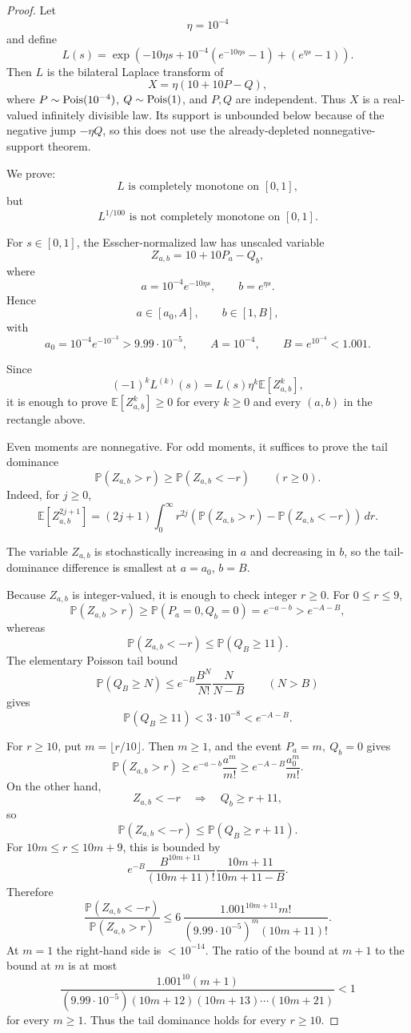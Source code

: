 \documentclass[11pt]{article}
\numberwithin{equation}{section}
\theoremstyle{definition}
\theoremstyle{remark}
\newcommand{\1}{\mathbf 1}
\begin{document}
\begin{proof}
Let
\[
\eta=10^{-4}
\]
and define
\[
L(s)=\exp\left(
-10\eta s+10^{-4}\left(e^{-10\eta s}-1\right)+\left(e^{\eta s}-1\right)
\right).
\]
Then \(L\) is the bilateral Laplace transform of
\[
X=\eta(10+10P-Q),
\]
where \(P\sim {\rm Pois}(10^{-4})\), \(Q\sim{\rm Pois}(1)\), and \(P,Q\) are independent. Thus \(X\) is a real-valued infinitely divisible law. Its support is unbounded below because of the negative jump \(-\eta Q\), so this does not use the already-depleted nonnegative-support theorem.

We prove:
\[
L\text{ is completely monotone on }[0,1],
\]
but
\[
L^{1/100}\text{ is not completely monotone on }[0,1].
\]

For \(s\in[0,1]\), the Esscher-normalized law has unscaled variable
\[
Z_{a,b}=10+10P_a-Q_b,
\]
where
\[
a=10^{-4}e^{-10\eta s},\qquad b=e^{\eta s}.
\]
Hence
\[
a\in[a_0,A],\qquad b\in[1,B],
\]
with
\[
a_0=10^{-4}e^{-10^{-3}}>9.99\cdot10^{-5},\qquad
A=10^{-4},\qquad B=e^{10^{-4}}<1.001.
\]

Since
\[
(-1)^kL^{(k)}(s)=L(s)\eta^k\mathbb E[Z_{a,b}^k],
\]
it is enough to prove \(\mathbb E[Z_{a,b}^k]\ge0\) for every \(k\ge0\) and every \((a,b)\) in the rectangle above.

Even moments are nonnegative. For odd moments, it suffices to prove the tail dominance
\[
\mathbb P(Z_{a,b}>r)\ge \mathbb P(Z_{a,b}<-r)
\qquad(r\ge0).
\]
Indeed, for \(j\ge0\),
\[
\mathbb E[Z_{a,b}^{2j+1}]
=(2j+1)\int_0^\infty r^{2j}
\left(\mathbb P(Z_{a,b}>r)-\mathbb P(Z_{a,b}<-r)\right)\,dr.
\]

The variable \(Z_{a,b}\) is stochastically increasing in \(a\) and decreasing in \(b\), so the tail-dominance difference is smallest at \(a=a_0\), \(b=B\).

Because \(Z_{a,b}\) is integer-valued, it is enough to check integer \(r\ge0\). For \(0\le r\le9\),
\[
\mathbb P(Z_{a,b}>r)\ge \mathbb P(P_a=0,Q_b=0)=e^{-a-b}>e^{-A-B},
\]
whereas
\[
\mathbb P(Z_{a,b}<-r)\le\mathbb P(Q_B\ge11).
\]
The elementary Poisson tail bound
\[
\mathbb P(Q_B\ge N)
\le e^{-B}\frac{B^N}{N!}\frac{N}{N-B}
\qquad(N>B)
\]
gives
\[
\mathbb P(Q_B\ge11)<3\cdot10^{-8}<e^{-A-B}.
\]

For \(r\ge10\), put \(m=\lfloor r/10\rfloor\). Then \(m\ge1\), and the event \(P_a=m,\ Q_b=0\) gives
\[
\mathbb P(Z_{a,b}>r)
\ge e^{-a-b}\frac{a^m}{m!}
\ge e^{-A-B}\frac{a_0^m}{m!}.
\]
On the other hand,
\[
Z_{a,b}<-r\quad\Longrightarrow\quad Q_b\ge r+11,
\]
so
\[
\mathbb P(Z_{a,b}<-r)\le \mathbb P(Q_B\ge r+11).
\]
For \(10m\le r\le10m+9\), this is bounded by
\[
e^{-B}\frac{B^{10m+11}}{(10m+11)!}\frac{10m+11}{10m+11-B}.
\]
Therefore
\[
\frac{\mathbb P(Z_{a,b}<-r)}
{\mathbb P(Z_{a,b}>r)}
\le
6\,\frac{1.001^{10m+11}m!}{(9.99\cdot10^{-5})^m(10m+11)!}.
\]
At \(m=1\) the right-hand side is \(<10^{-14}\). The ratio of the bound at \(m+1\) to the bound at \(m\) is at most
\[
\frac{1.001^{10}(m+1)}
{(9.99\cdot10^{-5})(10m+12)(10m+13)\cdots(10m+21)}
<1
\]
for every \(m\ge1\). Thus the tail dominance holds for every \(r\ge10\).


\end{proof}
\end{document}
